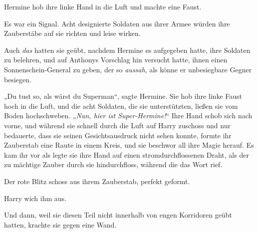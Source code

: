 Hermine hob ihre linke Hand in die Luft und machte eine Faust.

Es war ein Signal. Acht designierte Soldaten aus ihrer Armee würden ihre Zauberstäbe auf sie richten und leise  wirken.

Auch \emph{das} hatten sie geübt, nachdem Hermine es aufgegeben hatte, ihre Soldaten zu belehren, und auf Anthonys Vorschlag hin versucht hatte, ihnen einen Sonnenschein-General zu geben, der so \emph{aussah}, als könne er unbesiegbare Gegner besiegen.

„Du tust so, als wärst du Superman“, sagte Hermine. Sie hob ihre linke Faust hoch in die Luft, und die acht Soldaten, die sie unterstützten, ließen sie vom Boden hochschweben. „\emph{Nun, hier ist Super-Hermine!}“ Ihre Hand schob sich nach vorne, und während sie schnell durch die Luft auf Harry zuschoss und nur bedauerte, dass sie seinen Gesichtsausdruck nicht sehen konnte, formte ihr Zauberstab eine Raute in einem Kreis, und sie beschwor all ihre Magie herauf. Es kam ihr vor als legte sie ihre Hand auf einen stromdurchflossenen Draht, als der zu mächtige Zauber durch sie hindurchfloss, während die das Wort  rief.

Der rote Blitz schoss aus ihrem Zauberstab, perfekt geformt.

Harry wich ihm aus.

Und dann, weil sie diesen Teil nicht innerhalb von engen Korridoren geübt hatten, krachte sie gegen eine Wand.

